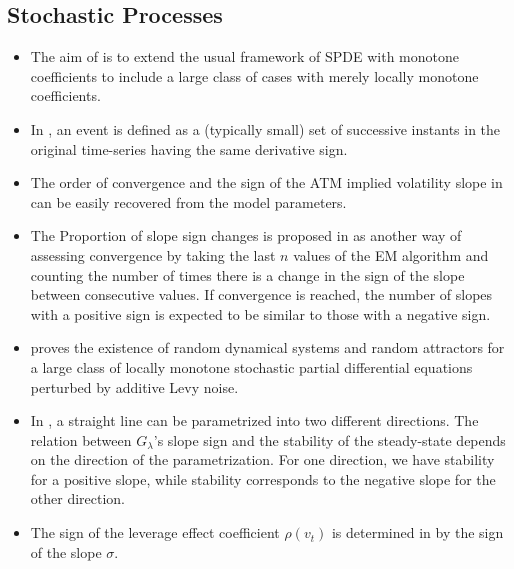 \documentclass[11pt]{book}
\begin{document}
\subsection{Stochastic Processes}
\begin{itemize}
\item The aim of \cite{liu2010spde}
is to extend the usual framework of SPDE with monotone coefficients
to include a large class of cases with merely locally monotone coefficients.
\item In \cite{da2012self},
an event is defined as a (typically small) set of successive instants
in the original time-series having the same derivative sign.
\item The order of convergence and the sign of the ATM implied volatility
slope in \cite{figueroa2016short}
can be easily recovered from the model parameters.
\item The \textquotedbl Proportion of slope sign changes\textquotedbl{}
is proposed in \cite{duchen2017inference}
as another way of assessing convergence by taking the last $n$ values
of the EM algorithm and counting the number of times there is a change
in the sign of the slope between consecutive values. If convergence
is reached, the number of slopes with a positive sign is expected
to be similar to those with a negative sign.
\item \cite{gess2020random}
proves the existence of random dynamical systems and random attractors
for a large class of locally monotone stochastic partial differential
equations perturbed by additive Levy noise.
\item In \cite{willers2020adaptive},
a straight line can be parametrized into two different directions.
The relation between $G_{\lambda}$'s slope sign and the stability
of the steady-state depends on the direction of the parametrization.
For one direction, we have stability for a positive slope, while stability
corresponds to the negative slope for the other direction.
\item The sign of the leverage effect coefficient $\rho\left(v_{t}\right)$
is determined in \cite{ait2021implied}
by the sign of the slope $\sigma$.
\end{itemize}
\end{document}
